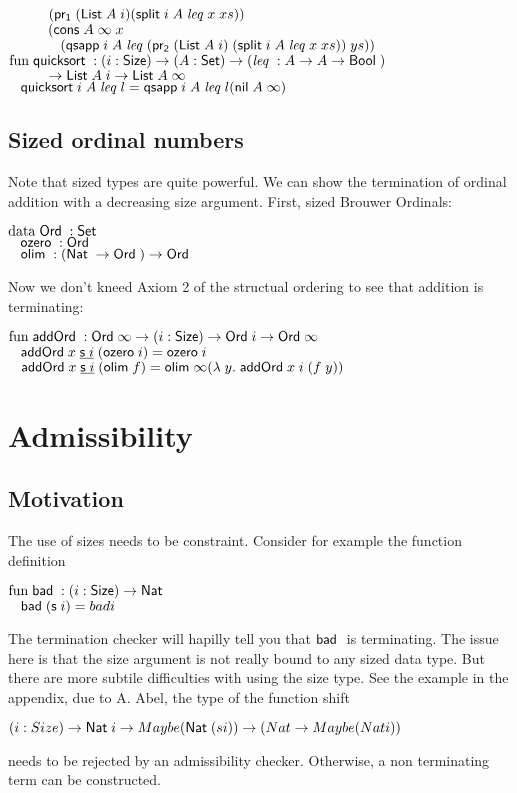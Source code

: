 \begin{bsp}
$\spcx	(\pra (\List A\; i) (\pivot i\; A\; \lleq x\; xs))$\\
$\spcx	(\cons A\; \infty \; x\; $\\
$\spcx	\spc   (\qsapp i\; A\; \lleq (\prb (\List A\; i) \; (\pivot i\; A\; \lleq x\; xs))\; ys))$\\
$\mathrm{fun}\; \mathsf{quicksort}\; : (i : \mathsf{Size} ) \rightarrow (A : \mathsf{Set} ) \rightarrow (\mathit{leq}\; : A \rightarrow A \rightarrow \mathsf{Bool}\;)$\\ 
$\spcx	\ra \List A\; i \ra \List A\; \infty$\\
$\hspace*{3mm} \mathsf{quicksort}\; i\; A\; \mathit{leq}\; l = \mathsf{qsapp}\; i\; A\; \mathit{leq}\; l (\mathsf{nil}\; A\; \infty)$ 
\end{bsp}

\subsection{Sized ordinal numbers}
Note that sized types are quite powerful. 
We can show the termination of ordinal addition with a decreasing size argument.
First, sized Brouwer Ordinals:
\begin{bsp}
$\mathrm{data}\; \mathsf{Ord}\; : \mathsf{Set}$ \\
$\hspace*{3mm} \mathsf{ozero}\; : \mathsf{Ord}\; $\\
$\hspace*{3mm} \mathsf{olim}\; : (\mathsf{Nat}\; \rightarrow \mathsf{Ord}\; ) \rightarrow \mathsf{Ord}\; $
\end{bsp}
Now we don't kneed Axiom 2 of the structual ordering to see that addition is terminating:
\begin{bsp}
$\mathrm{fun}\; \mathsf{addOrd}\; : \mathsf{Ord}\; \infty \rightarrow ( i : \mathsf{Size} ) \rightarrow{\mathsf{Ord}\;i \rightarrow\mathsf{Ord}\;\infty }$\\
$\hspace*{3mm} \mathsf{addOrd}\; x\; \underline{\mathsf{s}\; i}\; (\mathsf{ozero}\; i) = \mathsf{ozero}\; i $\\
$\hspace*{3mm} \mathsf{addOrd}\; x\; \underline{\mathsf{s}\; i}\; (\mathsf{olim}\; f)  = \mathsf{olim}\; \infty ( \lambda\; y .\; \mathsf{addOrd}\;  x \; i \; (f \; y))  $
\end{bsp}

\section{Admissibility}
\subsection{Motivation}
The use of sizes needs to be constraint.
Consider for example the function definition

\begin{bsp}
$\mathrm{fun}\; \mathsf{bad}\; : ( i : \mathsf{Size} ) \rightarrow{\mathsf{Nat}\;}$\\
$\hspace*{3mm} \mathsf{bad}\; (\mathsf{s}\; i) = bad i $ 
\end{bsp}
The termination checker will hapilly tell you that $\mathsf{bad}\;$ is terminating.
The issue here is that the size argument is not really bound to any sized data type.
But there are more subtile difficulties with using the size type.
See the example in the appendix, due to A. Abel,
the type of the function shift
\begin{bsp}
$( i : Size ) \rightarrow{\mathsf{Nat}\;i \rightarrow Maybe (\mathsf{Nat}\;(s i)) \rightarrow(Nat \rightarrow Maybe (Nat i))} $ 
\end{bsp}
needs to be rejected by an admissibility checker.
Otherwise, a non terminating term can be constructed.
